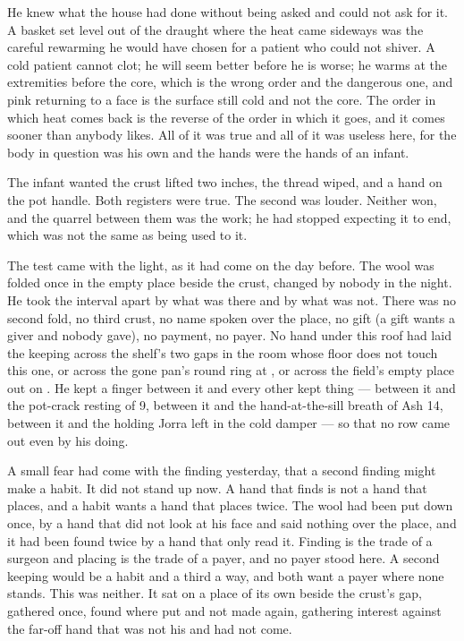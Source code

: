 He knew what the house had done without being asked and could not ask for it. A basket set level out of the draught where the heat came sideways was the careful rewarming he would have chosen for a patient who could not shiver. A cold patient cannot clot; he will seem better before he is worse; he warms at the extremities before the core, which is the wrong order and the dangerous one, and pink returning to a face is the surface still cold and not the core. The order in which heat comes back is the reverse of the order in which it goes, and it comes sooner than anybody likes. All of it was true and all of it was useless here, for the body in question was his own and the hands were the hands of an infant.

The infant wanted the crust lifted two inches, the thread wiped, and a hand on the pot handle. Both registers were true. The second was louder. Neither won, and the quarrel between them was the work; he had stopped expecting it to end, which was not the same as being used to it.

\scenebreak

The test came with the light, as it had come on the day before. The wool was folded once in the empty place beside the crust, changed by nobody in the night. He took the interval apart by what was there and by what was not. There was no second fold, no third crust, no name spoken over the place, no gift (a gift wants a giver and nobody gave), no payment, no payer. No hand under this roof had laid the keeping across the shelf's two gaps in the room whose floor does not touch this one, or across the gone pan's round ring at , or across the field's empty place out on . He kept a finger between it and every other kept thing — between it and the pot-crack resting of  9, between it and the hand-at-the-sill breath of Ash 14, between it and the holding Jorra left in the cold damper — so that no row came out even by his doing.

A small fear had come with the finding yesterday, that a second finding might make a habit. It did not stand up now. A hand that finds is not a hand that places, and a habit wants a hand that places twice. The wool had been put down once, by a hand that did not look at his face and said nothing over the place, and it had been found twice by a hand that only read it. Finding is the trade of a surgeon and placing is the trade of a payer, and no payer stood here. A second keeping would be a habit and a third a way, and both want a payer where none stands. This was neither. It sat on a place of its own beside the crust's gap, gathered once, found where put and not made again, gathering interest against the far-off hand that was not his and had not come.

